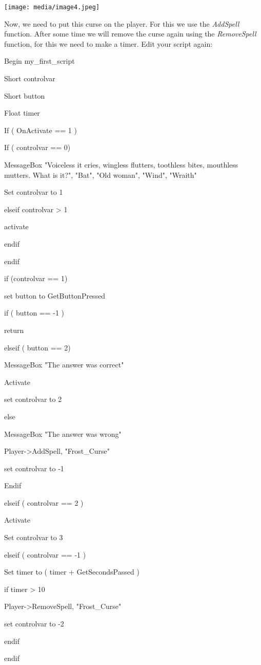 \documentclass[
]{article}
\begin{document}
\texttt{[image: media/image4.jpeg]}

Now, we need to put this curse on the player. For this we use the
\emph{AddSpell} function. After some time we will remove the curse again
using the \emph{RemoveSpell} function, for this we need to make a timer.
Edit your script again:

Begin my\_first\_script

Short controlvar

Short button

Float timer

If ( OnActivate == 1 )

If ( controlvar == 0)

MessageBox "Voiceless it cries, wingless flutters, toothless bites,
mouthless mutters. What is it?", "Bat", "Old woman", "Wind", "Wraith"

Set controlvar to 1

elseif controlvar \textgreater{} 1

activate

endif

endif

if (controlvar == 1)

set button to GetButtonPressed

if ( button == -1 )

return

elseif ( button == 2)

MessageBox "The answer was correct"

Activate

set controlvar to 2

else

MessageBox "The answer was wrong"

Player-\textgreater AddSpell, "Frost\_Curse"

set controlvar to -1

Endif

elseif ( controlvar == 2 )

Activate

Set controlvar to 3

elseif ( controlvar == -1 )

Set timer to ( timer + GetSecondsPassed )

if timer \textgreater{} 10

Player-\textgreater RemoveSpell, "Frost\_Curse"

set controlvar to -2

endif

endif
\end{document}
